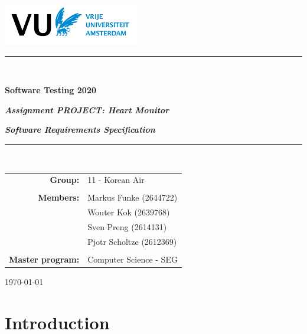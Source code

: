 \documentclass[a4paper]{article}
\begin{document}
\begin{center}
\vspace{1mm}
\includegraphics[height=18mm]{figs/VUlogo.png}

\vspace*{1.5cm}

\rule{.9\linewidth}{.6pt}\\[0.4cm]
{\huge \bfseries Software Testing 2020 \par}
\vspace{0.2cm}
{\large \bfseries \textit{Assignment PROJECT: Heart Monitor}\par}
{\large \bfseries \textit{Software Requirements Specification}\par}\vspace{0.4cm}
\rule{.9\linewidth}{.6pt}\\[1.5cm]


\vspace*{2mm}


{\large
    \begin{tabular}{rl}
    \textbf{Group:} & 11 - Korean Air \\ \\
    \textbf{Members:} & Markus Funke (2644722)  \\
                & Wouter Kok (2639768) \\
                & Sven Preng (2614131) \\
                & Pjotr Scholtze (2612369)  \\ \\
    \textbf{Master program:} & Computer Science - SEG
  \end{tabular}%
}


\vspace*{5cm}

\today\\[4cm] %
\thispagestyle{empty}
\end{center}



\tableofcontents
\thispagestyle{empty}
\clearpage


\renewcommand{\arraystretch}{1.5}


\section{Introduction}
\label{sec:intro}
\end{document}
